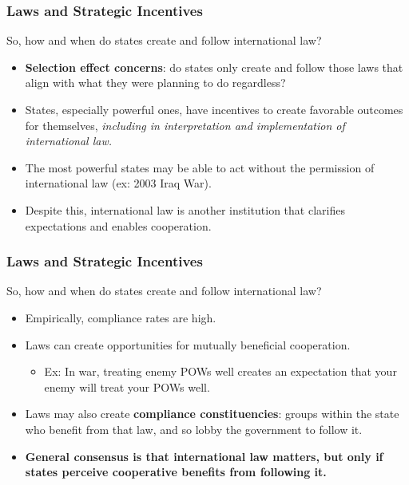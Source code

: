 \documentclass{beamer}
\begin{document}
\begin{frame} 
	\frametitle{\LARGE{Laws and Strategic Incentives}}
So, how and when do states create and follow international law? \pause
	\begin{itemize}
		\item \textbf{Selection effect concerns}: do states only create and follow those laws that align with what they were planning to do regardless? \pause
		\item States, especially powerful ones, have incentives to create favorable outcomes for themselves, \textit{including in interpretation and implementation of international law.} \pause
		\item The most powerful states may be able to act without the permission of international law (ex: 2003 Iraq War). \pause
		\item Despite this, international law is another institution that clarifies expectations and enables cooperation. 

	\end{itemize}
\end{frame}

\begin{frame} 
	\frametitle{\LARGE{Laws and Strategic Incentives}}
	So, how and when do states create and follow international law? 
	\begin{itemize}
		\item Empirically, compliance rates are high. \pause
		\item Laws can create opportunities for mutually beneficial cooperation. 
		\begin{itemize}
			\item Ex: In war, treating enemy POWs well creates an expectation that your enemy will treat your POWs well. \pause
		\end{itemize}
		\item Laws may also create \textbf{compliance constituencies}: groups within the state who benefit from that law, and so lobby the government to follow it. \pause
		\item \textbf{General consensus is that international law matters, but only if states perceive cooperative benefits from following it.}		
	\end{itemize}
\end{frame}
\end{document}
